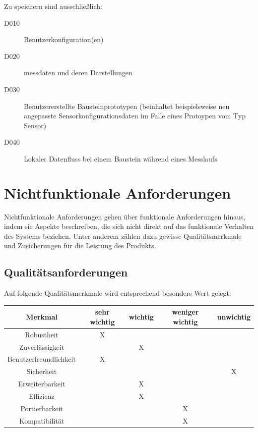 \documentclass[parskip=full]{scrartcl}
\begin{document}
Zu speichern sind ausschließlich:

\begin{description}

\item[D010] \gls{Benutzerkonfiguration}(en)
\item[D020] \gls{messdaten} und deren Darstellungen
\item[D030] Benutzererstellte Bausteinprototypen (beinhaltet beispielsweise neu angepasste Sensorkonfigurationsdaten im Falle eines Protoypen vom Typ Sensor)
\item[D040] Lokaler Datenfluss bei einem Baustein während eines Messlaufs 

\end{description}

\clearpage
\section{Nichtfunktionale Anforderungen}\label{nichtfunktionale}

Nichtfunktionale Anforderungen gehen über funktionale Anforderungen hinaus, indem sie Aspekte beschreiben, die sich nicht direkt auf das funktionale Verhalten des Systems beziehen. Unter anderem zählen dazu gewisse Qualitätsmerkmale und Zusicherungen für die Leistung des Produkts.

\subsection{Qualitätsanforderungen}\label{quali}

Auf folgende Qualitätsmerkmale wird entsprechend besonders Wert gelegt:

\begin{tabular}{ | c | c | c | c | c | }
	\hline
	\textbf{Merkmal} & \textbf{sehr wichtig} & \textbf{wichtig} & \textbf{weniger wichtig} & \textbf{unwichtig} \\
	\hline
	Robustheit & X & & & \\
	Zuverlässigkeit & & X & & \\
	Benutzerfreundlichkeit & X & & & \\
	Sicherheit & & & & X \\
	Erweiterbarkeit & & X & & \\
	Effizienz & & X & & \\
	Portierbarkeit & & & X & \\
	Kompatibilität & & & X & \\
	\hline
\end{tabular}
\end{document}
